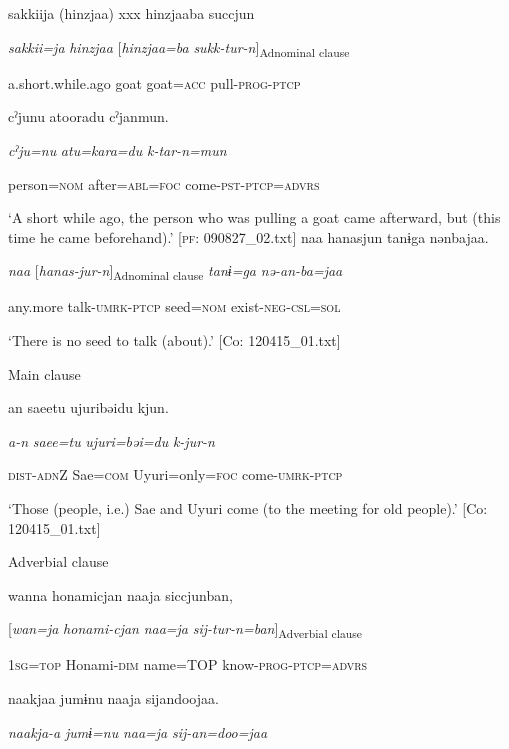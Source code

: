 \ea {\TM}
\glll  sakkiija  (hinzjaa)  xxx  hinzjaaba  succjun

      \textit{sakkii=ja}  \textit{hinzjaa}    [\textit{hinzjaa=ba}  \textit{sukk-tur-n}]\textsubscript{Adnominal clause}

      a.short.while.ago  goat    goat=\textsc{acc}  pull-\textsc{prog}-\textsc{ptcp}

      cˀjunu  atooradu  cˀjanmun.

      \textit{cˀju=nu}  \textit{atu=kara=du}  \textit{k-tar-n=mun}

      person=\textsc{nom}  after=\textsc{abl}=\textsc{foc}  come-\textsc{pst}-\textsc{ptcp}=\textsc{advrs}

\glt ‘A short while ago, the person who was pulling a goat came afterward, but (this time he came beforehand).’ [\textsc{pf}: 090827\_02.txt]
\ex {\TM}
\glll  naa  hanasjun  tanɨga  nənbajaa.

      \textit{naa}  [\textit{hanas-jur-n}]\textsubscript{Adnominal clause}  \textit{tanɨ=ga}  \textit{nə-an-ba=jaa}

      any.more  talk-\textsc{umrk}-\textsc{ptcp}  seed=\textsc{nom}  exist-\textsc{neg}-\textsc{csl}=\textsc{sol}

\glt ‘There is no seed to talk (about).’ [Co: 120415\_01.txt]
\z

  Main clause

\ex {\TM}
\glll  an  saeetu  ujuribəidu  kjun.

      \textit{a-n}  \textit{saee=tu}  \textit{ujuri=bəi=du}  \textit{k-jur-n}

      \textsc{dist}-\textsc{adn}Z  Sae=\textsc{com}  Uyuri=only=\textsc{foc}  come-\textsc{umrk}-\textsc{ptcp}

\glt ‘Those (people, i.e.) Sae and Uyuri come (to the meeting for old people).’ [Co: 120415\_01.txt]
\z

  Adverbial clause

\ex {\TM}
\glll  wanna  honami{\textbar}cjan{\textbar}  naaja  siccjunban,

      [\textit{wan=ja}  \textit{honami-cjan}  \textit{naa=ja}  \textit{sij-tur-n=ban}]\textsubscript{Adverbial clause}

      1\textsc{sg}=\textsc{top}  Honami-\textsc{dim}  name=TOP  know-\textsc{prog}-\textsc{ptcp}=\textsc{advrs}

      naakjaa  jumɨnu  naaja  sijandoojaa.

      \textit{naakja-a}  \textit{jumɨ=nu}  \textit{naa=ja}  \textit{sij-an=doo=jaa}

